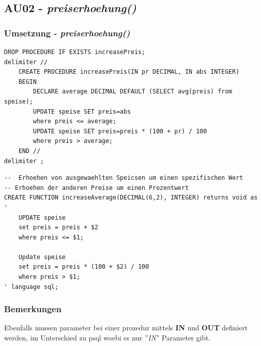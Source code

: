 \clearpage

\subsection{AU02 - \textit{preiserhoehung()}}
\subsubsection{Umsetzung - \textit{preiserhoehung()}}
\vspace{0.3cm}
\begin{minipage}{.5\textwidth}
	\begin{lstlisting}[style=sql1, caption={preiserhoehung() - MySQL}]
DROP PROCEDURE IF EXISTS increasePreis;
delimiter //
	CREATE PROCEDURE increasePreis(IN pr DECIMAL, IN abs INTEGER) 
	BEGIN
		DECLARE average DECIMAL DEFAULT (SELECT avg(preis) from speise);
		UPDATE speise SET preis=abs
		where preis <= average;
		UPDATE speise SET preis=preis * (100 + pr) / 100
		where preis > average;
	END //
delimiter ;
	\end{lstlisting}
\end{minipage}%
\begin{minipage}{.5\textwidth}
	\begin{lstlisting}[style=sql, caption={preiserhoehung() - PSQL}]
--	Erhoehen von ausgewaehlten Speicsen um einen spezifischen Wert	
-- Erhoehen der anderen Preise um einen Prozentwert
CREATE FUNCTION increaseAverage(DECIMAL(6,2), INTEGER) returns void as 
'
	UPDATE speise 
	set preis = preis + $2
	where preis <= $1;

	Update speise
	set preis = preis * (100 + $2) / 100
	where preis > $1;
' language sql;
	\end{lstlisting}
\end{minipage}

\subsubsection{Bemerkungen}
Ebenfalls mussen parameter bei einer prozedur mittels \textbf{IN} und \textbf{OUT} definiert werden, im Unterschied zu psql woebi es nur ''\textit{IN}'' Parameter gibt.

